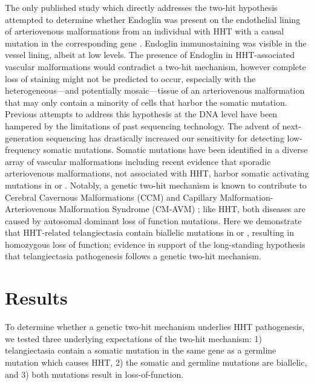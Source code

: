 The only published study which directly addresses the two-hit hypothesis attempted to determine whether Endoglin was present on the endothelial lining of arteriovenous malformations from an individual with HHT with a causal mutation in the corresponding gene  \citep{pece1999}. Endoglin immunostaining was visible in the vessel lining, albeit at low levels. The presence of Endoglin in HHT-associated vascular malformations would contradict a two-hit mechanism, however complete loss of staining might not be predicted to occur, especially with the heterogeneous---and potentially mosaic---tissue of an arteriovenous malformation that may only contain a minority of cells that harbor the somatic mutation. Previous attempts to address this hypothesis at the DNA level have been hampered by the limitations of past sequencing technology. The advent of next-generation sequencing has drastically increased our sensitivity for detecting low-frequency somatic mutations. Somatic mutations have been identified in a diverse array of vascular malformations \citep{alolabi2018, soblet2017, limaye2015, limaye2009, shirley2013, couto2015, luks2015} including recent evidence that sporadic arteriovenous malformations, not associated with HHT, harbor somatic activating mutations in  or  \citep{nikolaev2018, couto2017}. Notably, a genetic two-hit mechanism is known to contribute to Cerebral Cavernous Malformations (CCM) \citep{akers2009, mcdonald2014, gault2009} and Capillary Malformation-Arteriovenous Malformation Syndrome (CM-AVM) \citep{macmurdo2016}; like HHT, both diseases are caused by autosomal dominant loss of function mutations. Here we demonstrate that HHT-related telangiectasia contain biallelic mutations in  or , resulting in homozygous loss of function; evidence in support of the long-standing hypothesis that telangiectasia pathogenesis follows a genetic two-hit mechanism.


\section{Results}
To determine whether a genetic two-hit mechanism underlies HHT pathogenesis, we tested three underlying expectations of the two-hit mechanism: 1) telangiectasia contain a somatic mutation in the same gene as a germline mutation which causes HHT, 2) the somatic and germline mutations are biallelic, and 3) both mutations result in loss-of-function.

